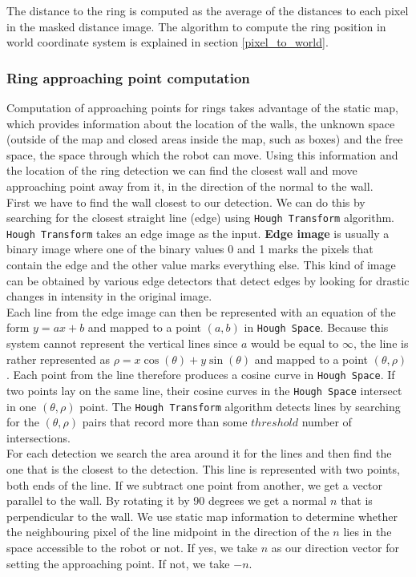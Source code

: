 \documentclass[12pt,a4paper]{article}
\begin{document}
	The distance to the ring is computed as the average of the distances to each pixel in the masked distance image. The algorithm to compute the ring position in world coordinate system is explained in section \ref{pixel_to_world}. \\

	\subsubsection{Ring approaching point computation}
	Computation of approaching points for rings takes advantage of the static map, which provides information about the location of the walls, the unknown space (outside of the map and closed areas inside the map, such as boxes) and the free space, the space through which the robot can move. Using this information and the location of the ring detection we can find the closest wall and move approaching point away from it, in the direction of the normal to the wall. \\

	First we have to find the wall closest to our detection. We can do this by searching for the closest straight line (edge) using \texttt{Hough Transform} algorithm. \texttt{Hough Transform} takes an edge image as the input. \textbf{Edge image} is usually a binary image where one of the binary values 0 and 1 marks the pixels that contain the edge and the other value marks everything else. This kind of image can be obtained by various edge detectors that detect edges by looking for drastic changes in intensity in the original image. \\
	
	Each line from the edge image can then be represented with an equation of the form $y = ax + b$ and mapped to a point $(a, b)$ in \texttt{Hough Space}. Because this system cannot represent the vertical lines since $a$ would be equal to $\infty$, the line is rather represented as $\rho = x\cos(\theta) + y\sin(\theta)$ and mapped to a point $(\theta, \rho)$. Each point from the line therefore produces a cosine curve in \texttt{Hough Space}. If two points lay on the same line, their cosine curves in the \texttt{Hough Space} intersect in one $(\theta, \rho)$ point. The \texttt{Hough Transform} algorithm detects lines by searching for the $(\theta, \rho)$ pairs that record more than some $threshold$ number of intersections. \\

	For each detection we search the area around it for the lines and then find the one that is the closest to the detection. This line is represented with two points, both ends of the line. If we subtract one point from another, we get a vector parallel to the wall. By rotating it by 90 degrees we get a normal $n$ that is perpendicular to the wall. We use static map information to determine whether the neighbouring pixel of the line midpoint in the direction of the $n$ lies in the space accessible to the robot or not. If yes, we take $n$ as our direction vector for setting the approaching point. If not, we take $-n$. \\
\end{document}

